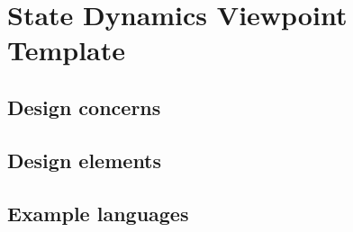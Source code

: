 \chapter{State Dynamics Viewpoint Template} \label{chp:state-dynamics-viewpoint-template}
	\begin{comment}
		Reactive systems and systems whose internal behavior is of interest use this viewpoint.
	\end{comment}
	
	\section{Design concerns} \label{s:state-dynamics-viewpoint-template:design-concerns}
		\begin{comment}
			System dynamics including modes, states, transitions, and reactions to events.
		\end{comment}
	
	\section{Design elements} \label{s:state-dynamics-viewpoint-template:design-elements}
		\begin{comment}
			Design entities: event, condition, state, transition, activity, composite state, submachine state, critical
			region, and trigger.
			
			Design relationships: part-of, internal, effect, entry, exit, and attached to.
			
			Design attributes: name, completion, active, initial, and final.
			
			Design constraints: guard conditions, concurrency, synchronization, state invariant, transition constraint,
			and protocol.
		\end{comment}
	
	\section{Example languages} \label{s:state-dynamics-viewpoint-template:example-languages}
		\begin{comment}
			UML state machine diagram (OMG [B28]), Harel statechart, state transition table (matrix), automata, Petri
			net.
		\end{comment}